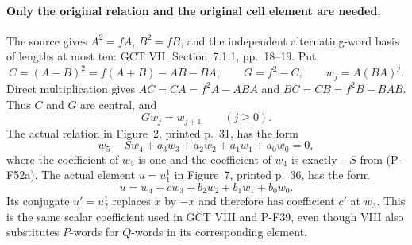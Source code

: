\documentclass[11pt,a4paper]{article}
\begin{document}
\paragraph{Only the original relation and the original cell element are needed.}
The source gives $A^2=fA$, $B^2=fB$, and the independent
alternating-word basis of lengths at most ten: GCT VII,
Section~7.1.1, pp.~18--19. Put
\[
       C=(A-B)^2=f(A+B)-AB-BA,
       \qquad G=f^2-C,
       \qquad w_j=A(BA)^j.
                                                               \tag{P-F52b}
\]
Direct multiplication gives
$AC=CA=f^2A-ABA$ and $BC=CB=f^2B-BAB$.
Thus $C$ and $G$ are central, and
\[
                    Gw_j=w_{j+1}\qquad(j\ge0).                 \tag{P-F52c}
\]
The actual relation in Figure~2, printed p.~31, has the form
\[
            w_5-Sw_4+a_3w_3+a_2w_2+a_1w_1+a_0w_0=0,          \tag{P-F52d}
\]
where the coefficient of $w_5$ is one and the coefficient of
$w_4$ is exactly $-S$ from (P-F52a). The actual element $u=u_1^1$ in
Figure~7, printed p.~36, has the form
\[
                  u=w_4+cw_3+b_2w_2+b_1w_1+b_0w_0.            \tag{P-F52e}
\]
Its conjugate $u'=u_2^1$ replaces $x$ by $-x$ and therefore has
coefficient $c'$ at $w_3$. This is the same scalar coefficient
used in GCT VIII and P-F39, even though VIII also substitutes
$P$-words for $Q$-words in its corresponding element.
\end{document}
